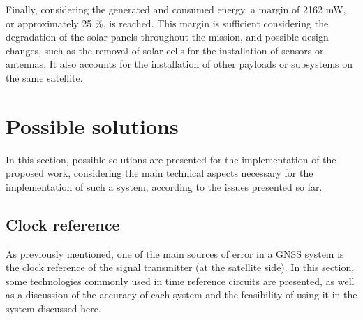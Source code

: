 
Finally, considering the generated and consumed energy, a margin of 2162 mW, or approximately 25 \%, is reached. This margin is sufficient considering the degradation of the solar panels throughout the mission, and possible design changes, such as the removal of solar cells for the installation of sensors or antennas. It also accounts for the installation of other payloads or subsystems on the same satellite.

\section{Possible solutions}


In this section, possible solutions are presented for the implementation of the proposed work, considering the main technical aspects necessary for the implementation of such a system, according to the issues presented so far.

\subsection{Clock reference}

As previously mentioned, one of the main sources of error in a GNSS system is the clock reference of the signal transmitter (at the satellite side). In this section, some technologies commonly used in time reference circuits are presented, as well as a discussion of the accuracy of each system and the feasibility of using it in the system discussed here.


